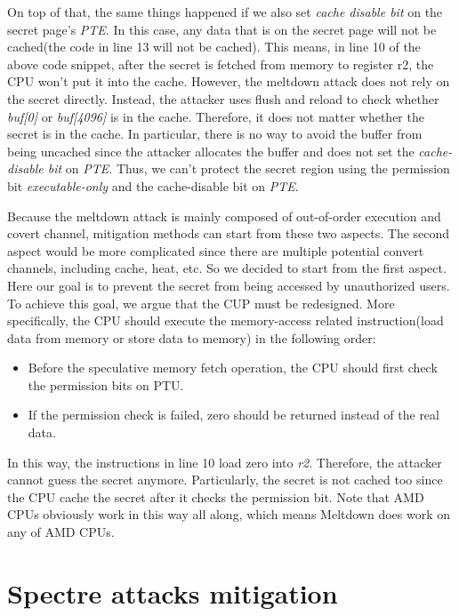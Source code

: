   On top of that, the same things happened if we also set \emph{cache disable bit} 
  on the secret page's \emph{PTE}.  In this case, any data 
  that is on the secret page will not be cached(the code in line 
  13 will not be cached).  This means,  in line 10 of the above code snippet, 
  after the secret is fetched from memory to register r2, the CPU won't 
  put it into the cache.  However, the meltdown attack does not rely on the 
  secret directly.  Instead, the attacker uses flush and reload to check 
  whether \emph{buf[0]} or \emph{buf[4096]} is in the cache. Therefore, it does not 
  matter whether the secret is in the cache.  In particular, there is no 
  way to avoid the buffer from being uncached since the attacker allocates 
  the buffer and does not set the \emph{cache-disable bit} on \emph{PTE}. Thus, we can't
   protect the secret region using the permission bit \emph{executable-only}
   and the cache-disable bit on \emph{PTE}.
  


  Because the meltdown attack is mainly composed of out-of-order 
  execution and covert channel, mitigation methods can start from 
  these two aspects. The second aspect would be more complicated 
  since there are multiple potential convert channels, including 
  cache, heat, etc.  So we decided to start from the first aspect. 
  Here our goal is to prevent the secret from being accessed by 
  unauthorized users. To achieve this goal, we argue that the CUP 
  must be redesigned.  More specifically, the CPU should execute 
  the memory-access related instruction(load data from memory or 
  store data to memory) in the following order\cite{3}:


  \begin{itemize}
    \item Before the speculative memory fetch operation, the CPU should first check the permission bits on PTU. 
    \item If the permission check is failed, zero should be returned instead of the real data.
  \end{itemize}
  In this way, the instructions in line 10 load zero into \emph{r2}. 
  Therefore, the attacker cannot guess the secret anymore. Particularly, the secret is not cached too since the CPU cache the secret after 
  it checks the permission bit. Note that AMD CPUs obviously work in
  this way all along, which means Meltdown does work on any of AMD CPUs\cite{26}.


\section{Spectre attacks mitigation}

